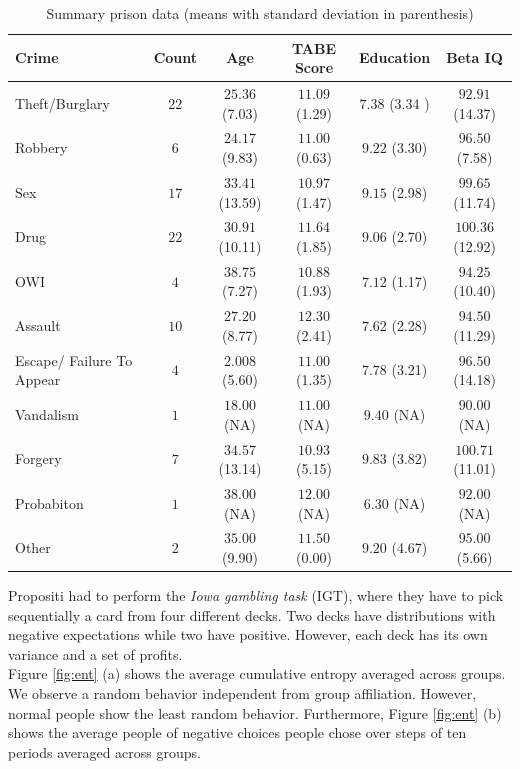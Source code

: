 \documentclass[12pt,a4paper,bibliography=totocnumbered,listof=totocnumbered]{scrartcl}
\begin{document}
\begin{table}[!htbp]
	\footnotesize
	 \centering 
	\begin{tabular}{ l|ccccc} 
		\toprule 
		Crime & \textbf{Count} & \textbf{Age} & \textbf{TABE Score} & \textbf{Education} & \textbf{Beta IQ} \\ 
		\hline
	Theft/Burglary & $22$ & $25.36$  (7.03) & $11.09$ (1.29) & $7.38$ (3.34 )& $92.91$ (14.37) \\ 
	Robbery & $6$ & $24.17$ (9.83) & $11.00$ (0.63) & $9.22$ (3.30) & $96.50$ (7.58) \\          
	Sex & $17$ & $33.41$ (13.59) & $10.97$ (1.47) & $9.15$ (2.98) & $99.65$ (11.74) \\       
	Drug & $22$ & $30.91$ (10.11)  & $11.64$ (1.85)& $9.06$   (2.70)  & $100.36$ (12.92) \\     
	OWI & $4$ & $38.75$ (7.27) & $10.88$ (1.93) & $7.12$ (1.17)& $94.25$ (10.40) \\        
	Assault & $10$ & $27.20$ (8.77) & $12.30$ (2.41)& $7.62$ (2.28) & $94.50$ (11.29) \\       
	Escape/ Failure To Appear & $4$ & $2.008$ (5.60)& $11.00$ (1.35)& $7.78$  (3.21)& $96.50$  (14.18)\\     
	Vandalism & $1$ & $18.00$ (NA)& $11.00$ (NA)& $9.40$ (NA)& $90.00$ (NA)\\ 
	Forgery & $7$ & $34.57$ (13.14)& $10.93$ (5.15) & $9.83$ (3.82)& $100.71$ (11.01)\\       
	Probabiton & $1$ & $38.00$ (NA)& $12.00$ (NA)& $6.30$ (NA)& $92.00$ (NA)\\ 
	Other & $2$ & $35.00$ (9.90)& $11.50$ (0.00)& $9.20$ (4.67)& $95.00$ (5.66)\\       
		\bottomrule 
	\end{tabular} 
		\caption{Summary prison data (means with standard deviation in parenthesis)} 
		\label{tab:tabps} 
\end{table} 

Propositi had to perform the \textit{Iowa gambling task} (IGT), where they have to pick sequentially a card from four different decks. Two decks have distributions with negative expectations while two have positive. However, each deck has its own variance and a set of profits. \\
Figure \ref{fig:ent} (a) shows the average cumulative entropy averaged across groups. We observe a random behavior independent from group affiliation. However, normal people show the least random behavior. Furthermore, Figure \ref{fig:ent} (b) shows the average people of negative choices people chose over steps of ten periods averaged across groups.     
\end{document}
